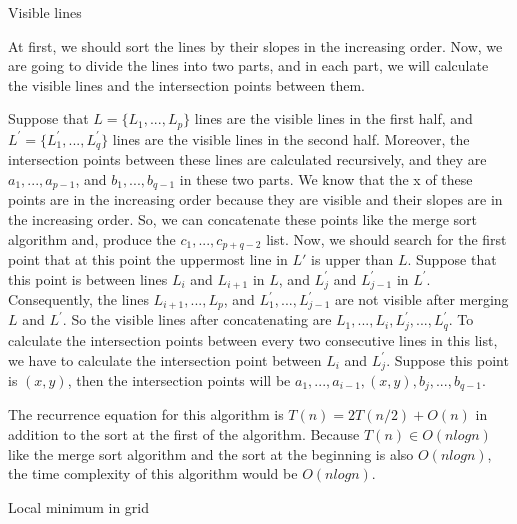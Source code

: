 \documentclass[12pt]{article}
\newenvironment{solution}[2][Solution]{\begin{trivlist}
\item[\hskip \labelsep {\bfseries #1}]}{\end{trivlist}}
\newenvironment{problem}[2][Problem]{\begin{trivlist}
\item[\hskip \labelsep {\bfseries #1}\hskip \labelsep {\bfseries #2.}]}{\end{trivlist}}
\begin{document}
\begin{problem}{2}
Visible lines
\end{problem}

\begin{solution}{}
At first, we should sort the lines by their slopes in the increasing order. Now,
we are going to divide the lines into two parts, and in each part, we will calculate
the visible lines and the intersection points between them.

Suppose that $L = \{L_1, ..., L_p\}$ lines are the visible lines in the first
half, and $L^\prime = \{L^\prime_1, ..., L^\prime_q\}$ lines are the visible
lines in the second half. Moreover, the intersection points between these lines
are calculated recursively, and they are $a_1, ..., a_{p-1}$, and $b_1, ...,
b_{q-1}$ in these two parts. We know that the x of these points are in the
increasing order because they are visible and their slopes are in the increasing
order. So, we can concatenate these points like the merge sort algorithm and,
produce the $c_1, ..., c_{p+q-2}$ list. Now, we should search 
for the first point that at this point the uppermost line in $L\prime$ is upper
than $L$. Suppose that this point is between lines $L_i$ and $L_{i+1}$ in $L$,
and $L^\prime_j$ and $L^\prime_{j-1}$ in $L^\prime$. Consequently, the lines 
$L_{i+1}, ..., L_p$, and $L^\prime_1, ..., L^\prime_{j-1}$ are not visible after
merging $L$ and $L^\prime$. So the visible lines after concatenating are
$L_1, ..., L_i, L^\prime_j, ..., L^\prime_q$. To calculate the intersection points
between every two consecutive lines in this list, we have to calculate the
intersection point between $L_i$ and $L^\prime_j$. Suppose this point is $(x, y)$,
then the intersection points will be $a_1, ..., a_{i-1}, (x, y), b_j, ..., b_{q-1}$.

The recurrence equation for this algorithm is $T(n) = 2T(n/2) + O(n)$ in addition to
the sort at the first of the algorithm. Because $T(n) \in O(nlogn)$ like the merge sort
algorithm and the sort at the beginning is also $O(nlogn)$, the time complexity of this 
algorithm would be $O(nlogn)$.

\end{solution}


\begin{problem}{3}
Local minimum in grid
\end{problem}
\end{document}
